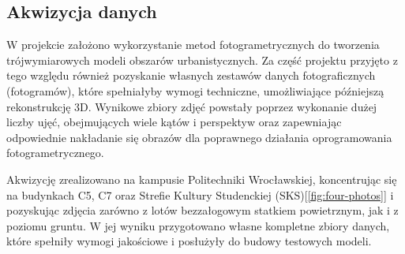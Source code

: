\subsection{Akwizycja danych}
W projekcie założono wykorzystanie metod fotogrametrycznych do tworzenia trójwymiarowych modeli obszarów urbanistycznych. Za część projektu przyjęto z tego względu również pozyskanie własnych
zestawów danych fotograficznych (fotogramów), które spełniałyby wymogi techniczne, umożliwiające
późniejszą rekonstrukcję 3D. Wynikowe zbiory zdjęć powstały poprzez wykonanie dużej liczby ujęć, obejmujących wiele kątów i perspektyw oraz zapewniając odpowiednie nakładanie się obrazów dla poprawnego działania oprogramowania fotogrametrycznego.


Akwizycję zrealizowano na kampusie Politechniki Wrocławskiej, koncentrując się na budynkach C5,
C7 oraz Strefie Kultury Studenckiej (SKS)[\ref{fig:four-photos}] i pozyskując zdjęcia zarówno z lotów bezzałogowym statkiem powietrznym, jak i z poziomu gruntu. W jej wyniku przygotowano własne kompletne zbiory danych, które spełniły wymogi jakościowe i posłużyły do budowy testowych modeli.

